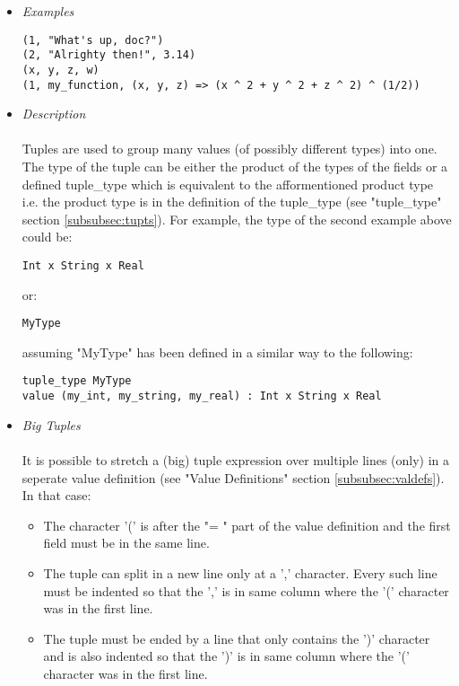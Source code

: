 \documentclass{article}
\begin{document}
\begin{itemize}

\item \textit{Examples}
\begin{verbatim}
(1, "What's up, doc?")
(2, "Alrighty then!", 3.14)
(x, y, z, w)
(1, my_function, (x, y, z) => (x ^ 2 + y ^ 2 + z ^ 2) ^ (1/2))
\end{verbatim}

\item \textit{Description} \\\\
Tuples are used to group many values (of possibly different types) into one.
The type of the tuple can be either the product of the types of the fields or a
defined tuple\_type which is equivalent to the afformentioned product type i.e.
the product type is in the definition of the tuple\_type (see "tuple\_type"
section \ref{subsubsec:tupts}). For example, the type of the second example above 
could be:
\begin{verbatim}
Int x String x Real
\end{verbatim}
or:
\begin{verbatim}
MyType
\end{verbatim}
assuming "MyType" has been defined in a similar way to the following:
\begin{verbatim}
tuple_type MyType
value (my_int, my_string, my_real) : Int x String x Real
\end{verbatim}

\item \textit{Big Tuples} \\\\
It is possible to stretch a (big) tuple expression over multiple lines (only)
in a seperate value definition (see "Value Definitions" section
\ref{subsubsec:valdefs}).  In that case:
\begin{itemize}
\item
The character '(' is after the "= " part of the value definition
and the first field must be in the same line.

\item
The tuple can split in a new line only at a ',' character. Every such line must
be indented so that the ',' is in same column where the '(' character was in
the first line.

\item
The tuple must be ended by a line that only contains the ')' character and is 
also indented so that the ')' is in same column where the '(' character was in
the first line.


\end{itemize}
\end{itemize}
\end{document}
